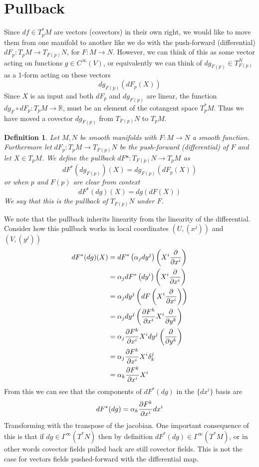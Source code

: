 \documentclass[a4paper]{article}
\newtheorem*{defn}{Definition}
\begin{document}
 \section*{Pullback}%
 Since $df \in T_p^*M$ are vectors (covectors) in their own right, we would like to move them from one manifold to another like we do with the push-forward (differential) $dF_p: T_pM \rightarrow T_{F(p)}N$, for $F: M \rightarrow N$.  However, we can think of this as some vector acting on functions $g \in C^{\infty}(V)$, or equivalently we can think of $dg_{F(p)} \in T_{F(p)}^N$ as a 1-form acting on these vectors
 \[
   dg_{F(p)} \left( dF_p \left(X\right) \right)
 \]
 Since $X$ is an input and both $dF_p$ and $dg_{F(p)}$ are linear, the function $dg_F \circ dF_p: T_pM \rightarrow \mathds{R}$, must be an element of the cotangent space $T_p^*M$. Thus we have moved a covector $dg_{F(p)}$ from $T_{F(p)}N$ to $T_pM$.
 \begin{defn}
   Let $M,N$ be smooth manifolds with $F: M \rightarrow N$ a smooth function. Furthermore let $dF_p: T_pM \rightarrow T_{F(p)}N$ be the push-forward (differential) of $F$ and let $X \in T_pM$. We define the pullback $dF*: T_{F(p)}N \rightarrow T_pM$ as 
   \[
     dF^*(dg_{F(p)})(X) = dg_{F(p)}(dF_p(X))
   \]
   or when $p$ and $F(p)$ are clear from context
   \[
     dF^*(dg)(X) = dg(dF(X))
   \]
   We say that this is the pullback of $T_{F(p)}N$ under $F$.
 \end{defn}
 We note that the pullback inherits linearity from the linearity of the differential. Consider how this pullback works in local coordinates $(U, (x^j))$ and $(V, (y^j))$
 \[
   \begin{aligned}
     dF^*(dg)(X) &= dF^* \left( \alpha_jdy^j \right) \left(X^i \pdv{x^i}  \right) \\
                 &= \alpha_j dF^*\left( dy^i \right) \left( X^i \pdv{x^i} \right) \\
                 &= \alpha_j dy^j \left( dF \left(X^i \pdv{x^i}\right) \right) \\
                 &= \alpha_j dy^j \left( \pdv{F^k}{x^i}X^i \pdv{y^k} \right) \\
                 &= \alpha_j \pdv{F^k}{x^i} X^i dy^j \left( \pdv{y^k} \right) \\
                 &= \alpha_j \pdv{F^k}{x^i} X^i \delta^j_k \\
                 &= \alpha_k \pdv{F^k}{x^i} X^i
   \end{aligned}
 \]
 From this we can see that the components of $dF^*(dg)$ in the $\{dx^i\}$ basis are 
 \[
   dF^*(dg) = \alpha_k \pdv{F^k}{x^i} dx^i
 \]
 Transforming with the transpose of the jacobian. One important consequence of this is that if $dg \in \Gamma^{\infty}(T^*N)$ then by definition $dF^*(dg) \in \Gamma^{\infty}(T^*M)$, or in other words covector fields pulled back are still covector fields. This is not the case for vectors fields pushed-forward with the differential map. 
\end{document}
